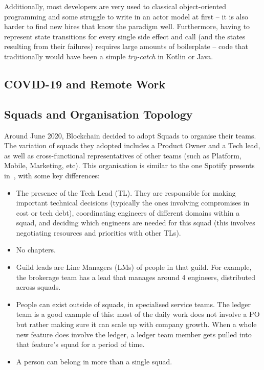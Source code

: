\documentclass[conference]{IEEEtran}
\begin{document}
    Additionally, most developers are very used to classical object-oriented programming and some
    struggle to write in an actor model at first -- it is also harder to find new hires that know the
    paradigm well.
    Furthermore, having to represent state transitions for every single side effect and call (and the
    states resulting from their failures) requires large amounts of boilerplate -- code that
    traditionally would have been a simple \emph{try-catch} in Kotlin or Java.

    \subsection{\textsc{COVID-19} and Remote Work}

    \subsection{Squads and Organisation Topology}\label{subsec:squads}

    Around June 2020, Blockchain decided to adopt Squads to organise their teams.
    The variation of squads they adopted includes a Product Owner and a Tech lead, as well as cross-functional representatives of other teams (such as Platform, Mobile, Marketing, etc).
    This organisation is similar to the one Spotify presents in~\cite{spotifySquads}, with some key differences:
    \begin{itemize}
        \item The presence of the Tech Lead (TL).
        They are responsible for making important technical decisions (typically the ones involving compromises in cost or tech debt), coordinating engineers of different domains within a squad, and deciding which engineers are needed for this squad (this involves negotiating resources and priorities with other TLs).
        \item No chapters.
        \item Guild leads are Line Managers (LMs) of people in that guild.
        For example, the brokerage team has a lead that manages around 4 engineers, distributed across squads.
        \item People can exist outside of squads, in specialised service teams.
        The ledger team is a good example of this: most of the daily work does not involve a PO but rather making sure it can scale up with company growth.
        When a whole new feature does involve the ledger, a ledger team member gets pulled into that feature's squad for a period of time.
        \item A person can belong in more than a single squad.
    \end{itemize}
\end{document}
